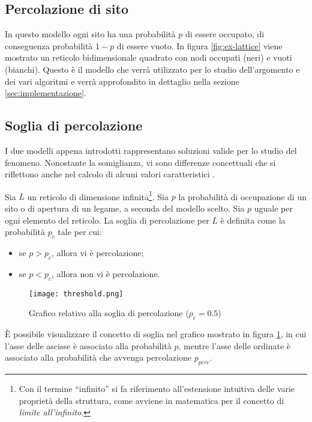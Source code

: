 \subsection*{Percolazione di sito}
In questo modello ogni sito ha una probabilità $p$ di essere occupato, di conseguenza
probabilità $1-p$ di essere vuoto. In figura \ref{fig:ex-lattice} viene mostrato un 
reticolo bidimensionale quadrato con nodi occupati (neri) e vuoti (bianchi). Questo è 
il modello che verrà utilizzato per lo studio dell'argomento e dei vari algoritmi e verrà
approfondito in dettaglio nella sezione \ref{sec:implementazione}.

\subsection*{Soglia di percolazione}
I due modelli appena introdotti rappresentano soluzioni valide per lo studio 
del fenomeno. Nonostante la somiglianza, vi sono differenze concettuali che si 
riflettono anche nel calcolo di alcuni valori caratteristici \cite{weisstein-bond,weisstein-site,weisstein-threshold}.

\begin{definition}
    Sia $L$ un reticolo di dimensione infinita\footnote{Con il termine ``infinito'' 
    si fa riferimento all'estensione intuitiva delle varie proprietà della struttura,
    come avviene in matematica per il concetto di \textit{limite all'infinito}.}. 
    Sia $p$ la probabilità di occupazione di un sito o di apertura 
    di un legame, a seconda del modello scelto. 
    Sia $p$ uguale per ogni elemento del reticolo.
    La soglia di percolazione per $L$ è definita come la 
    probabilità $p_c$ tale per cui:
    \begin{itemize}
        \item se $p > p_c$, allora vi è percolazione;
        \item se $p < p_c$, allora non vi è percolazione.
    \end{itemize}
\end{definition}

\begin{figure}
    \centering
    \texttt{[image: threshold.png]}
    \caption{Grafico relativo alla soglia di percolazione ($p_c=0.5$)}
    \label{fig:threshold}
\end{figure}

È possibile visualizzare il concetto di soglia nel grafico mostrato in 
figura \ref{fig:threshold}, in cui l'asse delle ascisse è associato alla 
probabilità $p$, mentre l'asse delle ordinate è associato alla probabilità
che avvenga percolazione $p_{perc}$.


